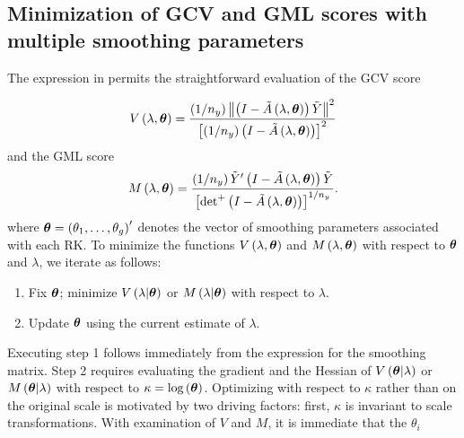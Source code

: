 \documentclass[12pt]{article}
\newcommand{\bftheta}{\mbox{\boldmath $\theta$}}
\newcommand{\tildeY}{\tilde{Y}}
\newcommand{\tildeA}{\tilde{A}}
\theoremstyle{definition}
\begin{document}
\subsection{Minimization of GCV and GML scores with multiple smoothing parameters}

The expression in \label{ref:cholesky-smoothing-matrix} permits the straightforward evaluation of the GCV score

\begin{equation} \label{eq:general-GCV-score}
V\left(\lambda, \bftheta \right) = \frac{\left( 1/n_y \right)  \left \lVert \left(I - \tildeA\left(\lambda, \bftheta \right)\right) \tildeY \right\rVert^2}{\left[\left( 1/n_y \right) \left(I - \tildeA\left(\lambda, \bftheta \right)\right)  \right]^2}
\end{equation}
\noindent
and the GML score
\begin{equation} \label{eq:general-GML-score}
M\left(\lambda, \bftheta \right) = \frac{\left( 1/n_y \right) \tildeY' \left(I - \tildeA\left(\lambda, \bftheta \right)\right) \tildeY }{\left[ \mbox{det}^+\left(I - \tildeA\left(\lambda, \bftheta \right)\right)  \right]^{1/n_y}}.
\end{equation}
\noindent
where $\bftheta = \left(\theta_1,\dots, \theta_g\right)'$ denotes the vector of smoothing parameters associated with each RK.
\bigskip
To minimize the functions $V\left(\lambda, \bftheta\right)$ and $M\left(\lambda, \bftheta\right)$ with respect to $\bftheta$ and $\lambda$, we iterate as follows:

\begin{enumerate}
\item Fix $\bftheta$; minimize $V\left(\lambda \vert \bftheta\right)$ or $M\left(\lambda \vert \bftheta\right)$ with respect to $\lambda$.
\item Update $\bftheta$ using the current estimate of $\lambda$.
\end{enumerate}
\noindent
Executing step 1 follows immediately from the expression for the smoothing matrix. Step 2 requires evaluating the gradient and the Hessian of $V\left( \bftheta \vert \lambda \right)$ or $M\left(\bftheta \vert \lambda\right)$ with respect to $\kappa = \log\left(\bftheta\right)$. Optimizing with respect to $\kappa$ rather than on the original scale is motivated by two driving factors: first, $\kappa$ is invariant to scale transformations. With examination of $V$ and $M$, it is immediate that the $\theta_i $ 




\end{document}
